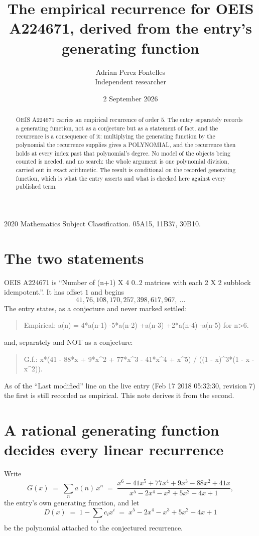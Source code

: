 \documentclass[11pt,a4paper]{article}
\title{The empirical recurrence for OEIS A224671, derived from the entry's generating function}
\author{Adrian Perez Fontelles\\ \small Independent researcher}
\date{2 September 2026}
\theoremstyle{plain}
\theoremstyle{definition}
\begin{document}
\maketitle

\begin{abstract}
OEIS A224671 carries an empirical recurrence of order $5$. The entry separately records a
generating function, not as a conjecture but as a statement of fact, and the recurrence is a
consequence of it: multiplying the generating function by the polynomial the recurrence
supplies gives a POLYNOMIAL, and the recurrence then holds at every index past that
polynomial's degree. No model of the objects being counted is needed, and no search: the
whole argument is one polynomial division, carried out in exact arithmetic. The result is
conditional on the recorded generating function, which is what the entry asserts and what is
checked here against every published term.
\end{abstract}

\noindent\small 2020 Mathematics Subject Classification. 05A15, 11B37, 30B10.\normalsize

\section{The two statements}

OEIS A224671 is ``Number of (n+1) X 4 0..2 matrices with each 2 X 2 subblock idempotent.''. It has offset $1$ and begins
\[
41, 76, 108, 170, 257, 398, 617, 967,\ \dots
\]
The entry states, as a conjecture and never marked settled:
\begin{quote}
Empirical: a(n) = 4*a(n-1) -5*a(n-2) +a(n-3) +2*a(n-4) -a(n-5) for n>6.
\end{quote}
and, separately and NOT as a conjecture:
\begin{quote}
G.f.: x*(41 - 88*x + 9*x\^{}2 + 77*x\^{}3 - 41*x\^{}4 + x\^{}5) / ((1 - x)\^{}3*(1 - x - x\^{}2)).
\end{quote}
As of the ``Last modified'' line on the live entry (Feb 17 2018 05:32:30, revision 7) the first is still
recorded as empirical. This note derives it from the second.

\section{A rational generating function decides every linear recurrence}

Write
\[
G(x)\;=\;\sum_{n}a(n)\,x^{n}\;=\;\frac{x^{6} - 41 x^{5} + 77 x^{4} + 9 x^{3} - 88 x^{2} + 41 x}{x^{5} - 2 x^{4} - x^{3} + 5 x^{2} - 4 x + 1},
\]
the entry's own generating function, and let
\[
D(x)\;=\;1-\sum_i c_i x^{i}\;=\;x^{5} - 2 x^{4} - x^{3} + 5 x^{2} - 4 x + 1
\]
be the polynomial attached to the conjectured recurrence.
\end{document}
